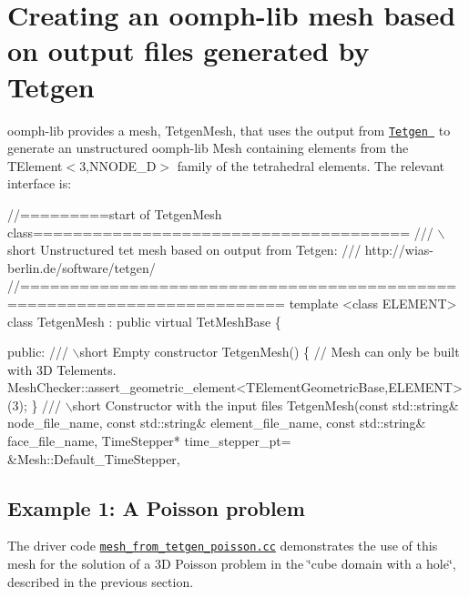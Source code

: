 \hypertarget{index_oomph_use}{}\section{Creating an oomph-\/lib mesh based on output files generated by Tetgen}\label{index_oomph_use}
{\ttfamily oomph-\/lib} provides a mesh, {\ttfamily Tetgen\+Mesh}, that uses the output from \href{http://wias-berlin.de/software/tetgen//}{\tt {\ttfamily Tetgen} } to generate an unstructured {\ttfamily oomph-\/lib} Mesh containing elements from the {\ttfamily T\+Element$<$3,\+N\+N\+O\+D\+E\+\_\+D$>$} family of the tetrahedral elements. The relevant interface is\+:

 
\begin{DoxyCodeInclude}
\textcolor{comment}{//=========start of TetgenMesh class======================================}
\textcolor{comment}{/// \(\backslash\)short  Unstructured tet mesh based on output from Tetgen:}
\textcolor{comment}{}\textcolor{comment}{/// http://wias-berlin.de/software/tetgen/}
\textcolor{comment}{}\textcolor{comment}{//========================================================================}
\textcolor{keyword}{template} <\textcolor{keyword}{class} ELEMENT>
\textcolor{keyword}{class }TetgenMesh : \textcolor{keyword}{public} \textcolor{keyword}{virtual} TetMeshBase
\{

\textcolor{keyword}{public}:
\textcolor{comment}{}
\textcolor{comment}{ /// \(\backslash\)short Empty constructor}
\textcolor{comment}{} TetgenMesh()
  \{
   \textcolor{comment}{// Mesh can only be built with 3D Telements.}
   MeshChecker::assert\_geometric\_element<TElementGeometricBase,ELEMENT>(3);
  \}
\textcolor{comment}{}
\textcolor{comment}{ /// \(\backslash\)short Constructor with the input files}
\textcolor{comment}{} TetgenMesh(\textcolor{keyword}{const} std::string& node\_file\_name,
            \textcolor{keyword}{const} std::string& element\_file\_name,
            \textcolor{keyword}{const} std::string& face\_file\_name,
            TimeStepper* time\_stepper\_pt=
            &Mesh::Default\_TimeStepper,

\end{DoxyCodeInclude}




 

\hypertarget{index_poisson}{}\subsection{Example 1\+: A Poisson problem}\label{index_poisson}
The driver code \href{../../../../demo_drivers/meshing/mesh_from_tetgen/mesh_from_tetgen_poisson.cc}{\tt mesh\+\_\+from\+\_\+tetgen\+\_\+poisson.\+cc} demonstrates the use of this mesh for the solution of a 3D Poisson problem in the \char`\"{}cube domain with a hole\char`\"{}, described in the previous section.

